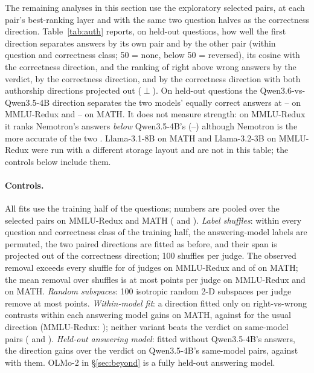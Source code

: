 The remaining analyses in this section use the exploratory selected pairs, at each pair's best-ranking layer and with the same two question halves as the correctness direction. Table~\ref{tab:auth} reports, on held-out questions, how well the first direction separates answers by its own pair and by the other pair (within question and correctness class; 50 = none, below 50 = reversed), its cosine with the correctness direction, and the ranking of right above wrong answers by the verdict, by the correctness direction, and by the correctness direction with both authorship directions projected out ($\perp$). On held-out questions the Qwen3.6-vs-Qwen3.5-4B direction separates the two models' equally correct answers at -- on MMLU-Redux and -- on MATH. It does not measure strength: on MMLU-Redux it ranks Nemotron's answers \emph{below} Qwen3.5-4B's (--) although Nemotron is the more accurate of the two \citep[answering models are identifiable from their text;][]{sun2025idiosyncrasies}. Llama-3.1-8B on MATH and Llama-3.2-3B on MMLU-Redux were run with a different storage layout and are not in this table; the controls below include them.

\paragraph{Controls.} All fits use the training half of the questions; numbers are pooled over the  selected pairs on MMLU-Redux and MATH ( and ). \emph{Label shuffles}: within every question and correctness class of the training half, the answering-model labels are permuted, the two paired directions are fitted as before, and their span is projected out of the correctness direction; 100 shuffles per judge. The observed removal exceeds every shuffle for  of  judges on MMLU-Redux and  of  on MATH; the mean removal over shuffles is at most  points per judge on MMLU-Redux and  on MATH. \emph{Random subspaces}: 100 isotropic random 2-D subspaces per judge remove at most  points. \emph{Within-model fit}: a direction fitted only on right-vs-wrong contrasts within each answering model gains  on MATH, against  for the usual direction (MMLU-Redux: ); neither variant beats the verdict on same-model pairs ( and ). \emph{Held-out answering model}: fitted without Qwen3.5-4B's answers, the direction gains  over the verdict on Qwen3.5-4B's same-model pairs, against  with them. OLMo-2 in \S\ref{sec:beyond} is a fully held-out answering model.


